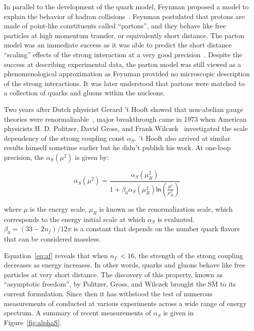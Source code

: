 In parallel to the development of the quark model, Feynman proposed a model to explain the behavior of hadron collisions~\cite{Feynman:1969wa}. Feynman postulated that protons are made of point-like constituents called ``partons'', and they behave like free particles at high momentum transfer, or equivalently short distance. The parton model was an immediate success as it was able to predict the short distance ``scaling'' effects of the strong interaction at a very good precision~\cite{Bjorken:1969ja}. Despite the success at describing experimental data, the parton model was still viewed as a phenomenological approximation as Feynman provided no microscopic description of the strong interactions. It was later understood that partons were matched to a collection of quarks and gluons within the nucleons.

Two years after Dutch physicist Gerard 't Hooft showed that non-abelian gauge theories were renormalizable~\cite{tHooft:1971akt}, major breakthrough came in 1973 when American physicists H. D. Politzer, David Gross, and Frank Wilczek~\cite{Gross:1973id,Politzer:1973fx} investigated the scale dependency of the strong coupling const $\alpha_{S}$. 't Hooft also arrived at similar results himself sometime earlier but he didn't publish his work. At one-loop precision, the $\alpha_{S}(\mu^2)$ is given by:

\begin{equation}
\label{eq:af}
\alpha_{S}(\mu^2)=\frac{\alpha_{S}(\mu_{R}^2)}{1+\beta_{0}\alpha_{S}(\mu_{R}^2)\textsf{ln}(\frac{\mu^2}{\mu_{R}^2})}
\end{equation}

where $\mu$ is the energy scale, $\mu_{R}$ is known as the renormalization scale, which corresponds to the energy initial scale at which $\alpha_{S}$ is evaluated. $\beta_{0}=(33-2n_{f})/12\pi$ is a constant that depends on the number quark flavors that can be considered massless. 

Equation~\ref{eq:af} reveals that when $n_{f}~<16$, the strength of the strong coupling decreases as energy increases. In other words, quarks and gluons behave like free particles at very short distance. The discovery of this property, known as ``asymptotic freedom'', by Politzer, Gross, and Wilczek brought the \ac{SM} to its current formulation. Since then it has withstood the test of numerous measurements of conducted at various experiments across a wide range of energy spectrum. A summary of recent measurements of $\alpha_{S}$ is given in Figure~\ref{fig:alphaS}.

